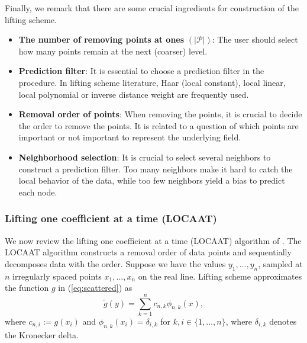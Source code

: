 \documentclass[11pt,titlepage]{article}
\begin{document}
Finally, we remark that there are some crucial ingredients for construction of the lifting scheme.
\begin{itemize}
	\item \textbf{The number of removing points at ones} $(|\mathcal{P}|)$: The user should select how many points remain at the next (coarser) level.  
	
	\item \textbf{Prediction filter}: It is essential to choose a prediction filter in the procedure. In lifting scheme literature, Haar (local constant), local linear, local polynomial or inverse distance weight are frequently used. 
	
	\item \textbf{Removal order of points}: When removing the points, it is crucial to decide the order to remove the points. It is related to a question of which points are important or not important to represent the underlying field. 
	
	\item \textbf{Neighborhood selection}: It is crucial to select several neighbors to construct a prediction filter. Too many neighbors make it hard to catch the local behavior of the data, while too few neighbors yield a bias to predict each node.
\end{itemize}

\subsubsection{Lifting one coefficient at a time (LOCAAT)}\label{sec:LOCAAT}
We now review the lifting one coefficient at a time (LOCAAT) algorithm of \cite{Jansen2009}. The LOCAAT algorithm constructs  a removal order of data points and sequentially decomposes data with the order. Suppose we have the values $y_{1}, \ldots, y_{n}$, sampled at $n$ irregularly spaced points $x_{1}, \ldots, x_{n}$ on the real line. Lifting scheme approximates the function $g$ in (\ref{eq:scattered}) as 
\[
\tilde{g}(y) = \sum_{k=1}^{n} c_{n,k} \phi_{n,k}(x),
\] 
where $c_{n,i}:=g(x_{i})$ and $\phi_{n,k} (x_{i}) = \delta_{i,k}$ for $k,i \in \{1, \ldots, n\}$, where $\delta_{i,k}$ denotes the Kronecker delta. %
\end{document}

